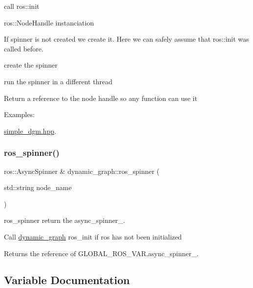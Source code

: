 call ros\+::init

ros\+::\+Node\+Handle instanciation

If spinner is not created we create it. Here we can safely assume that ros\+::init was called before.

create the spinner

run the spinner in a different thread

Return a reference to the node handle so any function can use it \begin{Desc}
\item[Examples\+: ]\par
\hyperlink{simple_dgm_8hpp-example}{simple\+\_\+dgm.\+hpp}.\end{Desc}
\mbox{\label{namespacedynamic__graph_a0ab97e95b56e05d30fd3112f8dfcf8eb}} 
\subsubsection{\texorpdfstring{ros\+\_\+spinner()}{ros\_spinner()}}
{\footnotesize\ttfamily ros\+::\+Async\+Spinner \& dynamic\+\_\+graph\+::ros\+\_\+spinner (\begin{DoxyParamCaption}\item[{std\+::string}]{node\+\_\+name }\end{DoxyParamCaption})}



ros\+\_\+spinner return the async\+\_\+spinner\+\_\+. 

Call \hyperlink{namespacedynamic__graph}{dynamic\+\_\+graph} ros\+\_\+init if ros has not been initialized \begin{DoxyReturn}{Returns}
the reference of G\+L\+O\+B\+A\+L\+\_\+\+R\+O\+S\+\_\+\+V\+A\+R.\+async\+\_\+spinner\+\_\+. 
\end{DoxyReturn}


\subsection{Variable Documentation}
\mbox{\label{namespacedynamic__graph_a877a1ed0d2adf7f675abf17f70b936a6}} 
